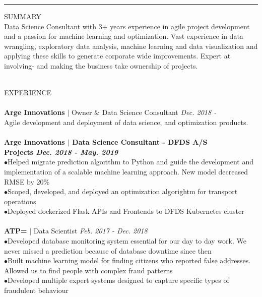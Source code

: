 \documentclass[10pt,a4paper]{article}
\newcommand{\newprojects}[3]{\\\textbf{#1}\\#2\\ \makebullet{#3}\\}
\newcommand{\headline}[1]{\Large \textcolor{myblue}{#1}}
\newcommand{\accomplishment}[1]{{\hspace*{-9pt}\textcolor{myblue}{$\bullet$}}\hspace*{4pt}\linespread{1.1}\footnotesize#1}
\begin{document}
\vspace{0.9cm}
\hrule height 0.4mm
\vspace{0.5cm}
{\headline{SUMMARY}}\\
Data Science Consultant with 3+ years experience in agile project development and a passion for machine learning and optimization. Vast experience in data wrangling, exploratory data analysis, machine learning and data visualization and applying these skills to generate corporate wide improvements. Expert at involving- and making the business take ownership of projects.\\
\vspace{0.3cm}
\\
  \begin{minipage}[t]{0.66\linewidth}
    {\headline{EXPERIENCE}}\\
    \vspace{-8pt}\\
    \textbf{Arge Innovations} $|$ Owner \& Data Science Consultant \hfill \textit{Dec. 2018 -} \\
    Agile development and deployment of data science, and optimization products.\\
    \newprojects{Arge Innovations $|$ Data Science Consultant - DFDS A/S \\ Projects \hfill \textmd{\textit{Dec. 2018 - May. 2019}}}%
        {%
            \accomplishment{Helped migrate prediction algorithm to Python and guide the development and implementation of a scalable machine learning approach. New model decreased RMSE by 20\%}\\%
            \accomplishment{Scoped, developed, and deployed an optimization algorightm for transport operations}\\%
            \accomplishment{Deployed dockerized Flask APIs and Frontends to DFDS Kubernetes cluster}%
        }{}
    \normalsize \textbf{ATP=} $|$ Data Scientist \hfill \textit{Feb. 2017 - Dec. 2018} \\
    \accomplishment{Developed database monitoring system essential for our day to day work. We never missed a prediction because of database downtime since then}\\
    \accomplishment{Built machine learning model for finding citizens who reported false addresses. Allowed us to find people with complex fraud patterns}\\
    \accomplishment{Developed multiple expert systems designed to capture specific types of fraudulent behaviour}\\

\end{minipage}
\end{document}
